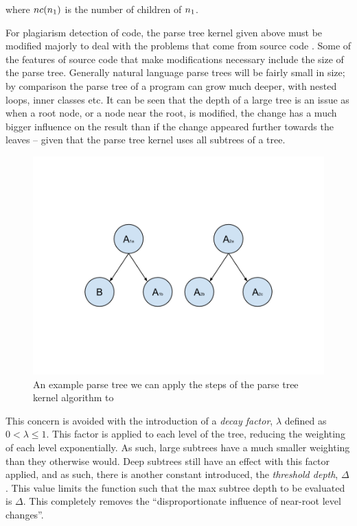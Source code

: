 where $nc(n\textsubscript{1})$ is the number of children of $n\textsubscript{1}$.

For plagiarism detection of code, the parse tree kernel given above must be
modified majorly to deal with the problems that come from source code
\cite{ParseTreeKernel}. Some of the features of source code that make modifications
necessary include the size of the parse tree. Generally natural language parse
trees will be fairly small in size; by comparison the parse tree of a program can
grow much deeper, with nested loops, inner classes etc. It can be seen that the
depth of a large tree is an issue as when a root node, or a node near the root,
is modified, the change has a much bigger influence on the result than if
the change appeared further towards the leaves -- given that the parse tree 
kernel uses all subtrees of a tree\cite{ParseTreeKernel}. 

\begin{figure}[H]
	\centering
		\includegraphics[width=\textwidth]{Figures/SimpleParseTree}
	\caption{An example parse tree we can apply the steps of the parse tree kernel
	algorithm to}
	\label{fig:SimpleParseTree}
\end{figure}

This concern is avoided with the introduction of a \emph{decay factor},
$\lambda$ defined as $0 < \lambda \le 1$. This factor is applied to each
level of the tree, reducing the weighting of each level exponentially.
As such, large subtrees have a much smaller weighting than they otherwise
would\cite{ParseTreeKernel}. Deep subtrees still have an effect with this factor
applied, and as such, there is another constant introduced, the \emph{threshold
depth}, $\Delta$. This value limits the function such that the max subtree depth
to be evaluated is $\Delta$. This completely removes the ``disproportionate influence
of near-root level changes''\cite{ParseTreeKernel}.

